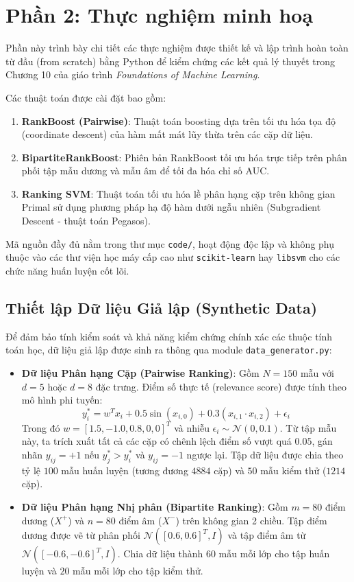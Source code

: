 \section{Phần 2: Thực nghiệm minh hoạ}
\label{sec:experiments}

Phần này trình bày chi tiết các thực nghiệm được thiết kế và lập trình hoàn toàn từ đầu (from scratch) bằng Python để kiểm chứng các kết quả lý thuyết trong Chương 10 của giáo trình \textit{Foundations of Machine Learning}. 

Các thuật toán được cài đặt bao gồm:
\begin{enumerate}
    \item \textbf{RankBoost (Pairwise)}: Thuật toán boosting dựa trên tối ưu hóa tọa độ (coordinate descent) của hàm mất mát lũy thừa trên các cặp dữ liệu.
    \item \textbf{BipartiteRankBoost}: Phiên bản RankBoost tối ưu hóa trực tiếp trên phân phối tập mẫu dương và mẫu âm để tối đa hóa chỉ số AUC.
    \item \textbf{Ranking SVM}: Thuật toán tối ưu hóa lề phân hạng cặp trên không gian Primal sử dụng phương pháp hạ độ hàm dưới ngẫu nhiên (Subgradient Descent - thuật toán Pegasos).
\end{enumerate}

Mã nguồn đầy đủ nằm trong thư mục \texttt{code/}, hoạt động độc lập và không phụ thuộc vào các thư viện học máy cấp cao như \texttt{scikit-learn} hay \texttt{libsvm} cho các chức năng huấn luyện cốt lõi.

\subsection{Thiết lập Dữ liệu Giả lập (Synthetic Data)}
Để đảm bảo tính kiểm soát và khả năng kiểm chứng chính xác các thuộc tính toán học, dữ liệu giả lập được sinh ra thông qua module \texttt{data\_generator.py}:
\begin{itemize}
    \item \textbf{Dữ liệu Phân hạng Cặp (Pairwise Ranking)}: Gồm $N = 150$ mẫu với $d = 5$ hoặc $d = 8$ đặc trưng. Điểm số thực tế (relevance score) được tính theo mô hình phi tuyến:
    $$y_i^* = w^T x_i + 0.5 \sin(x_{i,0}) + 0.3 (x_{i,1} \cdot x_{i,2}) + \epsilon_i$$
    Trong đó $w = [1.5, -1.0, 0.8, 0, 0]^T$ và nhiễu $\epsilon_i \sim \mathcal{N}(0, 0.1)$. Từ tập mẫu này, ta trích xuất tất cả các cặp có chênh lệch điểm số vượt quá $0.05$, gán nhãn $y_{ij} = +1$ nếu $y_j^* > y_i^*$ và $y_{ij} = -1$ ngược lại. Tập dữ liệu được chia theo tỷ lệ $100$ mẫu huấn luyện (tương đương $4884$ cặp) và $50$ mẫu kiểm thử ($1214$ cặp).
    
    \item \textbf{Dữ liệu Phân hạng Nhị phân (Bipartite Ranking)}: Gồm $m = 80$ điểm dương ($X^+$) và $n = 80$ điểm âm ($X^-$) trên không gian 2 chiều. Tập điểm dương được vẽ từ phân phối $\mathcal{N}([0.6, 0.6]^T, I)$ và tập điểm âm từ $\mathcal{N}([-0.6, -0.6]^T, I)$. Chia dữ liệu thành $60$ mẫu mỗi lớp cho tập huấn luyện và $20$ mẫu mỗi lớp cho tập kiểm thử.
\end{itemize}

